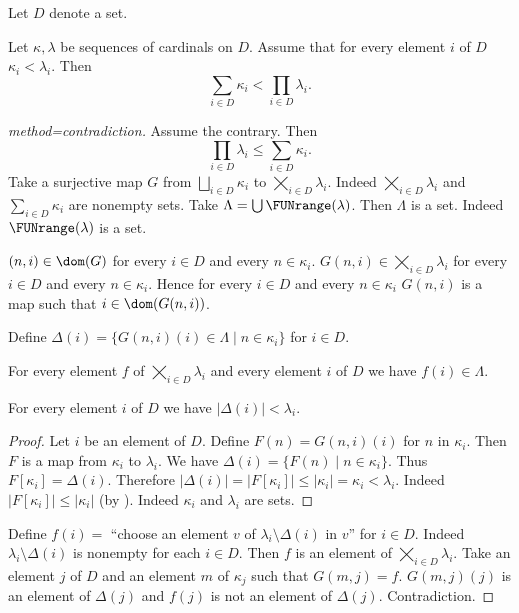 \documentclass{article}
\newcommand{\SumSet}[2]{\bigsqcup_{i \in #2} #1_{i}}
\newcommand{\Sum}[2]{\sum_{i \in #2} #1_{i}}
\newcommand{\ProdSet}[2]{\bigtimes_{i \in #2} #1_{i}}
\newcommand{\Prod}[2]{\prod_{i \in #2} #1_{i}}
\begin{document}
\begin{forthel}
  Let $D$ denote a set.

  \begin{theorem*}[title=König,id=koenig]
    Let $\kappa, \lambda$ be sequences of cardinals on $D$.
    Assume that for every element $i$ of $D$ $\kappa_{i} < \lambda_{i}$.
    Then \[ \Sum{\kappa}{D} < \Prod{\lambda}{D}. \]
  \end{theorem*}
  \begin{proof}[method=contradiction]
    Assume the contrary.
    Then \[ \Prod{\lambda}{D} \leq \Sum{\kappa}{D}. \]
    Take a surjective map $G$ from $\SumSet{\kappa}{D}$ to $\ProdSet{\lambda}{D}$.
    Indeed $\ProdSet{\lambda}{D}$ and $\Sum{\kappa}{D}$ are nonempty sets.
    Take $\Lambda = \bigcup \FUNrange(\lambda)$.
    Then $\Lambda$ is a set.
    Indeed $\FUNrange(\lambda)$ is a set.

    $(n,i) \in \dom(G)$ for every $i \in D$ and every $n \in \kappa_{i}$.
    $G(n,i) \in \ProdSet{\lambda}{D}$ for every $i \in D$ and every $n \in \kappa_{i}$.
    Hence for every $i \in D$ and every $n \in \kappa_{i}$ $G(n,i)$ is a map such that $i \in \dom(G(n,i))$.

    Define $\Delta(i) = \{ G(n,i)(i) \in \Lambda \mid n \in \kappa_{i} \}$ for $i \in D$.

    For every element $f$ of $\ProdSet{\lambda}{D}$ and every element $i$ of $D$ we have $f(i) \in \Lambda$.

    For every element $i$ of $D$ we have $|\Delta(i)| < \lambda_{i}$.
    \begin{proof}
      Let $i$ be an element of $D$.
      Define $F(n) = G(n,i)(i)$ for $n$ in $\kappa_{i}$.
      Then $F$ is a map from $\kappa_{i}$ to $\lambda_{i}$.
      We have $\Delta(i) = \{ F(n) \mid n \in \kappa_{i} \}$.
      Thus $F[\kappa_{i}] = \Delta(i)$.
      Therefore $|\Delta(i)|
        = |F[\kappa_{i}]|
        \leq |\kappa_{i}|
        = \kappa_{i}
        < \lambda_{i}$.
      Indeed $|F[\kappa_{i}]| \leq |\kappa_{i}|$ (by ).
      Indeed $\kappa_{i}$ and $\lambda_{i}$ are sets.
    \end{proof}

    Define $f(i) =$ ``choose an element $v$ of $\lambda_{i} \setminus \Delta(i)$ in $v$'' for $i \in D$.
    Indeed $\lambda_{i} \setminus \Delta(i)$ is nonempty for each $i \in D$.
    Then $f$ is an element of $\ProdSet{\lambda}{D}$.
    Take an element $j$ of $D$ and an element $m$ of $\kappa_{j}$ such that $G(m,j) = f$.
    $G(m,j)(j)$ is an element of $\Delta(j)$ and $f(j)$ is not an element of $\Delta(j)$.
    Contradiction.
  \end{proof}
\end{forthel}

\printbibliography
\end{document}
